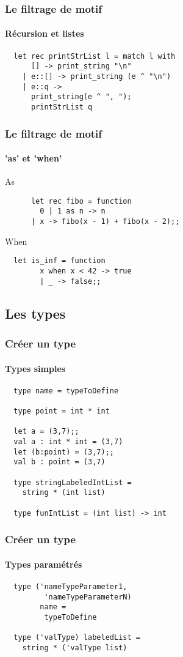 \begin{frame}[fragile]
	\frametitle{Le filtrage de motif}
	\framesubtitle{Récursion et listes}
		\begin{lstlisting}
  let rec printStrList l = match l with
      [] -> print_string "\n"
    | e::[] -> print_string (e ^ "\n")
    | e::q ->
      print_string(e ^ ", ");
      printStrList q
		\end{lstlisting}
\end{frame}

\begin{frame}[fragile]
  	\frametitle{Le filtrage de motif}
	\framesubtitle{'as' et 'when'}
  	\begin{block}{As}
    	\begin{lstlisting}
	  let rec fibo = function
 	    0 | 1 as n -> n
 	  | x -> fibo(x - 1) + fibo(x - 2);;
    	\end{lstlisting}
  	\end{block}
  	\begin{block}{When}
    	\begin{lstlisting}
  let is_inf = function
        x when x < 42 -> true
    	| _ -> false;;
    	\end{lstlisting}
  	\end{block}
\end{frame}

\subsection{Les types} %
\begin{frame}[fragile]
	\frametitle{Créer un type}
	\framesubtitle{Types simples}
	\begin{lstlisting}
  type name = typeToDefine

  type point = int * int

  let a = (3,7);;
  val a : int * int = (3,7)
  let (b:point) = (3,7);;
  val b : point = (3,7)

  type stringLabeledIntList =
    string * (int list)

  type funIntList = (int list) -> int
	\end{lstlisting}
\end{frame}

\begin{frame}[fragile]
	\frametitle{Créer un type}
	\framesubtitle{Types paramétrés}
	\begin{lstlisting}
  type ('nameTypeParameter1,
 	     'nameTypeParameterN)
   	    name =
         typeToDefine

  type ('valType) labeledList =
    string * ('valType list)
	\end{lstlisting}
\end{frame}


